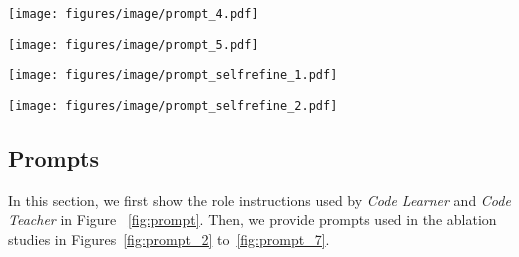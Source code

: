 \documentclass[11pt]{article}
\begin{document}
\begin{figure*}[h] \centering
    \texttt{[image: figures/image/prompt\_4.pdf]}
    \caption{Zero-Shot and Few-Shot prompts for code repairing. Task IDs 1, 2, 3 in HumanEval and HumanEval-X and task IDs 2, 3, 4 in MBPP are used to construct prompts.} \label{fig:prompt_4}
\end{figure*}

\begin{figure*}[h] \centering
    \texttt{[image: figures/image/prompt\_5.pdf]}
    \caption{Few-Shot CoT prompts for code repairing. Task IDs 2, 3 in HumanEval and HumanEval-X and task IDs 2, 3, 4 in MBPP are used to construct prompts.} \label{fig:prompt_5}
\end{figure*}

\begin{figure*}[h] \centering
    \texttt{[image: figures/image/prompt\_selfrefine\_1.pdf]}
    \caption{Repair method generation and code repair prompts in Self-Refine.} \label{fig:prompt_6}
\end{figure*}

\begin{figure*}[h] \centering
    \texttt{[image: figures/image/prompt\_selfrefine\_2.pdf]}
    \caption{Prompt for code repair using only error messages.} \label{fig:prompt_7}
\end{figure*}




 \subsection{Prompts}\label{app:prompt}
In this section, we first show the role instructions used by \textit{Code Learner} and \textit{Code Teacher} in Figure ~\ref{fig:prompt}. Then, we provide prompts used in the ablation studies in Figures~\ref{fig:prompt_2} to~\ref{fig:prompt_7}.






 
\end{document}
